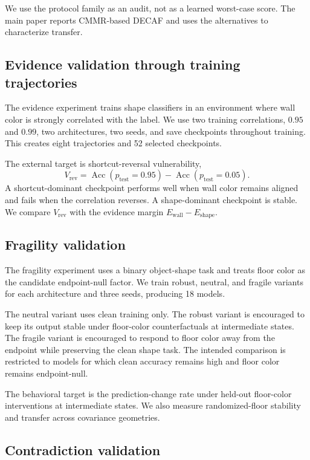 We use the protocol family as an audit, not as a learned worst-case score. The main paper reports CMMR-based DECAF and uses the alternatives to characterize transfer.

\subsection{Evidence validation through training trajectories}
\label{app:e-setup}

The evidence experiment trains shape classifiers in an environment where wall color is strongly correlated with the label. We use two training correlations, $0.95$ and $0.99$, two architectures, two seeds, and save checkpoints throughout training. This creates eight trajectories and 52 selected checkpoints.

The external target is shortcut-reversal vulnerability,
\[
V_{\mathrm{rev}}
=
\operatorname{Acc}(p_{\mathrm{test}}=0.95)
-
\operatorname{Acc}(p_{\mathrm{test}}=0.05).
\]
A shortcut-dominant checkpoint performs well when wall color remains aligned and fails when the correlation reverses. A shape-dominant checkpoint is stable. We compare $V_{\mathrm{rev}}$ with the evidence margin $E_{\mathrm{wall}}-E_{\mathrm{shape}}$.

\subsection{Fragility validation}
\label{app:f-setup}

The fragility experiment uses a binary object-shape task and treats floor color as the candidate endpoint-null factor. We train robust, neutral, and fragile variants for each architecture and three seeds, producing 18 models.

The neutral variant uses clean training only. The robust variant is encouraged to keep its output stable under floor-color counterfactuals at intermediate states. The fragile variant is encouraged to respond to floor color away from the endpoint while preserving the clean shape task. The intended comparison is restricted to models for which clean accuracy remains high and floor color remains endpoint-null.

The behavioral target is the prediction-change rate under held-out floor-color interventions at intermediate states. We also measure randomized-floor stability and transfer across covariance geometries.

\subsection{Contradiction validation}
\label{app:c-setup}


